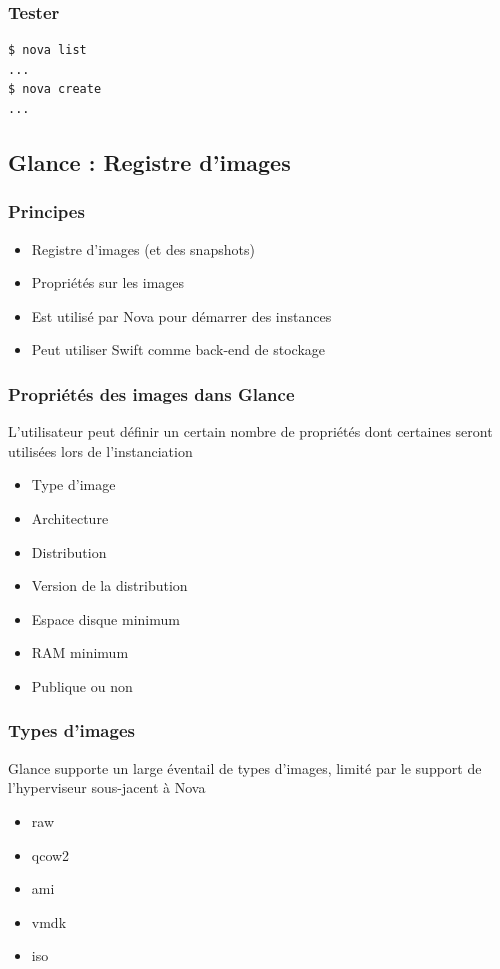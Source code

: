   \begin{frame}[containsverbatim]
    \frametitle{Tester}
\begin{verbatim}
$ nova list
...
$ nova create
...
\end{verbatim}
  \end{frame}

  \subsection[Glance]{Glance : Registre d'images}

  \begin{frame}
    \frametitle{Principes}
    \begin{itemize}
      \item Registre d'images (et des snapshots)
      \item Propriétés sur les images
      \item Est utilisé par Nova pour démarrer des instances
      \item Peut utiliser Swift comme back-end de stockage
    \end{itemize}
  \end{frame}

  \begin{frame}
    \frametitle{Propriétés des images dans Glance}
    L'utilisateur peut définir un certain nombre de propriétés dont certaines seront utilisées lors de l'instanciation
    \begin{itemize}
      \item Type d'image
      \item Architecture
      \item Distribution
      \item Version de la distribution
      \item Espace disque minimum
      \item RAM minimum
      \item Publique ou non
    \end{itemize}
  \end{frame}

  \begin{frame}
    \frametitle{Types d'images}
    Glance supporte un large éventail de types d'images, limité par le support de l'hyperviseur sous-jacent à Nova
    \begin{itemize}
      \item raw
      \item qcow2
      \item ami
      \item vmdk
      \item iso
    \end{itemize}
  \end{frame}

